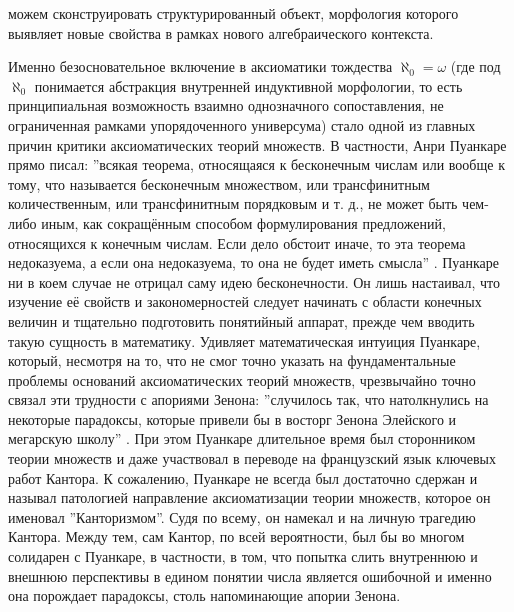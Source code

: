 \documentclass[12pt]{article}
\begin{document}
можем сконструировать структурированный объект, морфология которого выявляет новые свойства в рамках нового алгебраического контекста.

Именно безосновательное включение в аксиоматики тождества $\aleph_0 = \omega$ (где под $\aleph_0$ понимается абстракция внутренней индуктивной морфологии, то есть принципиальная возможность взаимно однозначного сопоставления, не ограниченная рамками упорядоченного универсума) стало одной из главных причин критики аксиоматических теорий множеств. В частности, Анри Пуанкаре прямо писал: ''всякая теорема, относящаяся к бесконечным числам или вообще к тому, что называется бесконечным множеством, или трансфинитным количественным, или трансфинитным порядковым и т. д., не может быть чем-либо иным, как сокращённым способом формулирования предложений, относящихся к конечным числам. Если дело обстоит иначе, то эта теорема недоказуема, а если она недоказуема, то она не будет иметь смысла'' \cite{poincare-infinity}. Пуанкаре ни в коем случае не отрицал саму идею бесконечности. Он лишь настаивал, что изучение её свойств и закономерностей следует начинать с области конечных величин и тщательно подготовить понятийный аппарат, прежде чем вводить такую сущность в математику. Удивляет математическая интуиция Пуанкаре, который, несмотря на то, что не смог точно указать на фундаментальные проблемы оснований аксиоматических теорий множеств, чрезвычайно точно связал эти трудности с апориями Зенона: ''случилось так, что натолкнулись на некоторые парадоксы, которые привели бы в восторг Зенона Элейского и мегарскую школу'' \cite{poincare-zeno}. При этом Пуанкаре длительное время был сторонником теории множеств и даже участвовал в переводе на французский язык ключевых работ Кантора. К сожалению, Пуанкаре не всегда был достаточно сдержан и называл патологией направление аксиоматизации теории множеств, которое он именовал ''Канторизмом''. Судя по всему, он намекал и на личную трагедию Кантора. Между тем, сам Кантор, по всей вероятности, был бы во многом солидарен с Пуанкаре, в частности, в том, что попытка слить внутреннюю и внешнюю перспективы в едином понятии числа является ошибочной и именно она порождает парадоксы, столь напоминающие апории Зенона.
\end{document}
